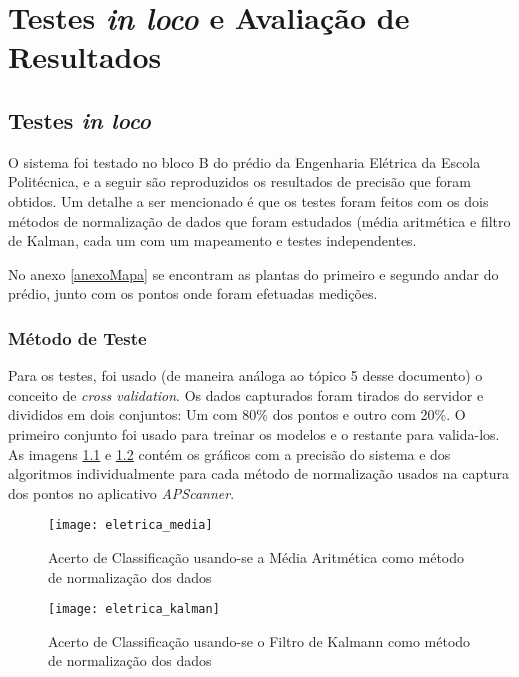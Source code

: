 \chapter{Testes \textit{in loco} e Avaliação de Resultados}

\section{Testes \textit{in loco}}

O sistema foi testado no bloco B do prédio da Engenharia Elétrica da Escola Politécnica, e a seguir são reproduzidos os resultados de precisão que foram obtidos. Um detalhe a ser mencionado é que os testes foram feitos com os dois métodos de normalização de dados que foram estudados (média aritmética e filtro de Kalman, cada um com um mapeamento e testes independentes.
\par
No anexo \ref{anexoMapa} se encontram as plantas do primeiro e segundo andar do prédio, junto com os pontos onde foram efetuadas medições.



\subsection{Método de Teste}

Para os testes, foi usado (de maneira análoga ao tópico 5 desse documento) o conceito de \textit{cross validation}. Os dados capturados foram tirados do servidor e divididos em dois conjuntos: Um com 80\% dos pontos e outro com 20\%. O primeiro conjunto foi usado para treinar os modelos e o restante para valida-los. As imagens \ref{fig:eletricaMedia} e \ref{fig:eletricaKalman} contém os gráficos com a precisão do sistema e dos algoritmos individualmente para cada método de normalização usados na captura dos pontos no aplicativo \textit{APScanner}.

\begin{figure}[H]

\centering
\caption{Acerto de Classificação usando-se a Média Aritmética como método de normalização dos dados}
\texttt{[image: eletrica\_media]}
\label{fig:eletricaMedia}

\end{figure}


\begin{figure}[H]

\centering
\caption{Acerto de Classificação usando-se o Filtro de Kalmann como método de normalização dos dados}
\texttt{[image: eletrica\_kalman]}
\label{fig:eletricaKalman}

\end{figure}

